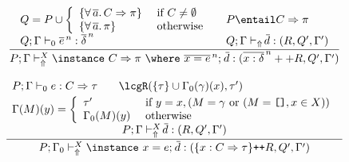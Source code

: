\begin{figure}
\[\begin{array}{cc}
	\displaystyle\frac
	 {\begin{array}{ll}
               Q = P \cup \left \{ \begin{array}{ll}
                         \{ \forall\,\overline{a}.\,C \Rightarrow \pi \} & \text{ if } C \not= \emptyset \\
                         \{ \forall\,\overline{a}.\,\pi \} & \text{ otherwise}
                                \end{array}\right. \: & \: 
               P \entail C \Rightarrow \pi \\
           Q;\Gamma \vdash_0 \overline{e}^{\,n} : \overline{\delta}^{\,n} \: & \: 
	   Q;\Gamma \vdash_{\Uparrow} \overline{\!d} : (R,Q',\Gamma') 
          \end{array}}
	 {P;\Gamma \vdash_{\Uparrow}^X \instance\ C \Rightarrow \pi\ \where\ \overline{x = e}^{\,n};\: \overline{\!d} 
             : (\overline{x : \delta}^{\,n} ++ R,Q',\Gamma')}\\ \\

	\displaystyle\frac
	 {\begin{array}{ll}
            P; \Gamma \vdash_0 e : C \Rightarrow \tau \:\: & \:\:
            \lcgR(\{ \tau\} \cup \Gamma_0(\gamma)(x), \tau') \\[.1cm]
            \multicolumn{2}{c}{\Gamma(M)(y) = \left\{ \begin{array}{ll}
                                      \tau' & \text{ if } y = x, (M = \gamma \text{ or }
                                                                 (M = \texttt{[]}, x \in X)) \\
                                      \Gamma_0(M)(y) & \text{ otherwise } 
                                   \end{array}\right.}\\[.2cm]                   
           \multicolumn{2}{c}{P;\Gamma \vdash_{\Uparrow}^X \overline{\!d} : (R,Q',\Gamma')} 
          \end{array}}
	 {P;\Gamma_0 \vdash_{\Uparrow}^X \instance\ x = e;\: \overline{\!d} : (\{x:C\Rightarrow \tau\} \texttt{++} R,Q',\Gamma')} \\ \\


\end{array}\]
\end{figure}
